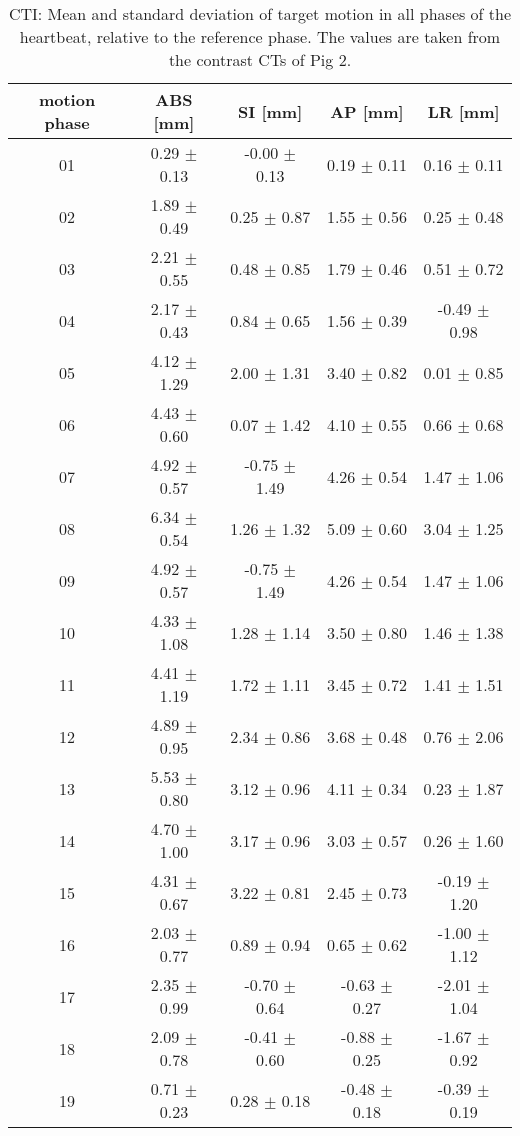 \newpage

\begin{table}[H]
  \centering
  \scriptsize
  \caption{CTI: Mean and standard deviation of target motion in all phases of the heartbeat, relative to the reference phase. The values are 
  taken from the contrast CTs of Pig 2.}
  \begin{tabular}{|c|c|c|c|c|}
    \hline\hline
    motion phase\rule{0pt}{2.6ex}\rule[-1.2ex]{0pt}{0pt} & ABS [mm] & SI [mm] & AP [mm] & LR [mm]\\
    \hline
01 &0.29 $\pm$ 0.13 &-0.00 $\pm$ 0.13 &0.19 $\pm$ 0.11 &0.16 $\pm$ 0.11 \\
02 &1.89 $\pm$ 0.49 &0.25 $\pm$ 0.87 &1.55 $\pm$ 0.56 &0.25 $\pm$ 0.48 \\
03 &2.21 $\pm$ 0.55 &0.48 $\pm$ 0.85 &1.79 $\pm$ 0.46 &0.51 $\pm$ 0.72 \\
04 &2.17 $\pm$ 0.43 &0.84 $\pm$ 0.65 &1.56 $\pm$ 0.39 &-0.49 $\pm$ 0.98 \\
05 &4.12 $\pm$ 1.29 &2.00 $\pm$ 1.31 &3.40 $\pm$ 0.82 &0.01 $\pm$ 0.85 \\
06 &4.43 $\pm$ 0.60 &0.07 $\pm$ 1.42 &4.10 $\pm$ 0.55 &0.66 $\pm$ 0.68 \\
07 &4.92 $\pm$ 0.57 &-0.75 $\pm$ 1.49 &4.26 $\pm$ 0.54 &1.47 $\pm$ 1.06 \\
08 &6.34 $\pm$ 0.54 &1.26 $\pm$ 1.32 &5.09 $\pm$ 0.60 &3.04 $\pm$ 1.25 \\
09 &4.92 $\pm$ 0.57 &-0.75 $\pm$ 1.49 &4.26 $\pm$ 0.54 &1.47 $\pm$ 1.06 \\
10 &4.33 $\pm$ 1.08 &1.28 $\pm$ 1.14 &3.50 $\pm$ 0.80 &1.46 $\pm$ 1.38 \\
11 &4.41 $\pm$ 1.19 &1.72 $\pm$ 1.11 &3.45 $\pm$ 0.72 &1.41 $\pm$ 1.51 \\
12 &4.89 $\pm$ 0.95 &2.34 $\pm$ 0.86 &3.68 $\pm$ 0.48 &0.76 $\pm$ 2.06 \\
13 &5.53 $\pm$ 0.80 &3.12 $\pm$ 0.96 &4.11 $\pm$ 0.34 &0.23 $\pm$ 1.87 \\
14 &4.70 $\pm$ 1.00 &3.17 $\pm$ 0.96 &3.03 $\pm$ 0.57 &0.26 $\pm$ 1.60 \\
15 &4.31 $\pm$ 0.67 &3.22 $\pm$ 0.81 &2.45 $\pm$ 0.73 &-0.19 $\pm$ 1.20 \\
16 &2.03 $\pm$ 0.77 &0.89 $\pm$ 0.94 &0.65 $\pm$ 0.62 &-1.00 $\pm$ 1.12 \\
17 &2.35 $\pm$ 0.99 &-0.70 $\pm$ 0.64 &-0.63 $\pm$ 0.27 &-2.01 $\pm$ 1.04 \\
18 &2.09 $\pm$ 0.78 &-0.41 $\pm$ 0.60 &-0.88 $\pm$ 0.25 &-1.67 $\pm$ 0.92 \\
19 &0.71 $\pm$ 0.23 &0.28 $\pm$ 0.18 &-0.48 $\pm$ 0.18 &-0.39 $\pm$ 0.19 \\
    \hline\hline
  \end{tabular}
  \label{tab:motion:CTI:Pig2}
\end{table}


